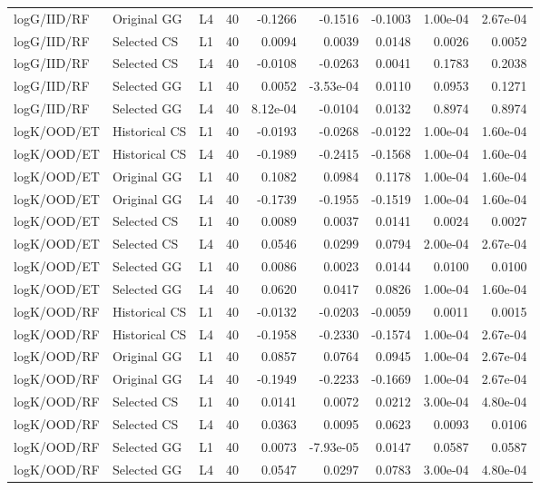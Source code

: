 \documentclass[9pt]{article}
\begin{document}
\begin{longtable}{p{2.0cm}p{1.35cm}ccrrrrr}
logG/IID/RF & Original GG & L4 & 40 & -0.1266 & -0.1516 & -0.1003 & 1.00e-04 & 2.67e-04\\
logG/IID/RF & Selected CS & L1 & 40 & 0.0094 & 0.0039 & 0.0148 & 0.0026 & 0.0052\\
logG/IID/RF & Selected CS & L4 & 40 & -0.0108 & -0.0263 & 0.0041 & 0.1783 & 0.2038\\
logG/IID/RF & Selected GG & L1 & 40 & 0.0052 & -3.53e-04 & 0.0110 & 0.0953 & 0.1271\\
logG/IID/RF & Selected GG & L4 & 40 & 8.12e-04 & -0.0104 & 0.0132 & 0.8974 & 0.8974\\
logK/OOD/ET & Historical CS & L1 & 40 & -0.0193 & -0.0268 & -0.0122 & 1.00e-04 & 1.60e-04\\
logK/OOD/ET & Historical CS & L4 & 40 & -0.1989 & -0.2415 & -0.1568 & 1.00e-04 & 1.60e-04\\
logK/OOD/ET & Original GG & L1 & 40 & 0.1082 & 0.0984 & 0.1178 & 1.00e-04 & 1.60e-04\\
logK/OOD/ET & Original GG & L4 & 40 & -0.1739 & -0.1955 & -0.1519 & 1.00e-04 & 1.60e-04\\
logK/OOD/ET & Selected CS & L1 & 40 & 0.0089 & 0.0037 & 0.0141 & 0.0024 & 0.0027\\
logK/OOD/ET & Selected CS & L4 & 40 & 0.0546 & 0.0299 & 0.0794 & 2.00e-04 & 2.67e-04\\
logK/OOD/ET & Selected GG & L1 & 40 & 0.0086 & 0.0023 & 0.0144 & 0.0100 & 0.0100\\
logK/OOD/ET & Selected GG & L4 & 40 & 0.0620 & 0.0417 & 0.0826 & 1.00e-04 & 1.60e-04\\
logK/OOD/RF & Historical CS & L1 & 40 & -0.0132 & -0.0203 & -0.0059 & 0.0011 & 0.0015\\
logK/OOD/RF & Historical CS & L4 & 40 & -0.1958 & -0.2330 & -0.1574 & 1.00e-04 & 2.67e-04\\
logK/OOD/RF & Original GG & L1 & 40 & 0.0857 & 0.0764 & 0.0945 & 1.00e-04 & 2.67e-04\\
logK/OOD/RF & Original GG & L4 & 40 & -0.1949 & -0.2233 & -0.1669 & 1.00e-04 & 2.67e-04\\
logK/OOD/RF & Selected CS & L1 & 40 & 0.0141 & 0.0072 & 0.0212 & 3.00e-04 & 4.80e-04\\
logK/OOD/RF & Selected CS & L4 & 40 & 0.0363 & 0.0095 & 0.0623 & 0.0093 & 0.0106\\
logK/OOD/RF & Selected GG & L1 & 40 & 0.0073 & -7.93e-05 & 0.0147 & 0.0587 & 0.0587\\
logK/OOD/RF & Selected GG & L4 & 40 & 0.0547 & 0.0297 & 0.0783 & 3.00e-04 & 4.80e-04\\

\end{longtable}
\end{document}
